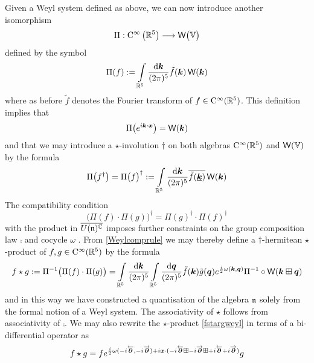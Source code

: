Given a Weyl system defined as above, we can now introduce another isomorphism
\begin{equation}
  \label{Omegaquantmap}
  \Pi : {\rm C}^\infty\left({\mathbb R}^5\right) \longrightarrow 
  \operatorname{{\sf W}}\bigl(\mathbb{V}\bigr)
\end{equation}
defined by the symbol
\begin{equation}
  \label{Omegafdef}
  \Pi(f):=\int\limits_{{\mathbb R}^5}\frac{{\rm d}{{\boldsymbol {k} }}}{(2\pi)^5} 
  \tilde{f}({{\boldsymbol {k} }}) \operatorname{{\sf W}}({{\boldsymbol {k} }})
\end{equation}
where as before $\tilde f$ denotes the Fourier transform of
$f\in{\rm C}^\infty({\mathbb R}^5)$. This definition implies that
\begin{equation}
  \label{weylmkDelta}
  \Pi\bigl( e^{ i{{\boldsymbol {k} }}\cdot{{\boldsymbol {x} }}}\bigr)=\operatorname{{\sf W}}({{\boldsymbol {k} }})
\end{equation}
and that we may introduce a $\star$-involution $\dag$ on both algebras
${\rm C}^\infty({\mathbb R}^5)$ and $\operatorname{{\sf W}}({\mathbb V})$ by the formula
\begin{equation}
  \label{involdef}
  \Pi\bigl(f^\dag\bigr)=\Pi\bigl(f\bigr)^\dag:=
  \int\limits_{{\mathbb R}^5}\frac{{\rm d}{{\boldsymbol {k} }}}{(2\pi)^5} \overline{
    \tilde f( \underline{{{\boldsymbol {k} }}} )} \operatorname{{\sf W}}({{\boldsymbol {k} }})
\end{equation}
The compatibility condition
\begin{equation}
  \label{compconddag}
  \bigl(\Pi(f)\cdot\Pi(g)\bigr)^\dag=\Pi(g)^\dag\cdot
  \Pi(f)^\dag
\end{equation}
with the product in $\overline{U({\mathfrak n})^{\mathbb C}}$ imposes further constraints on the
group composition law $\comp$ and cocycle $\omega$ \cite{ALZ1}. From
\eqref{Weylcomprule} we may thereby define a $\dag$-hermitean $\star$-product of
$f,g\in{\rm C}^\infty({\mathbb R}^5)$ by the formula
\begin{equation}
  \label{fstargweyl}
  f\star g:=\Pi^{-1}\bigl(\Pi(f)\cdot\Pi(g)\bigr)
  =\int\limits_{{\mathbb R}^5}\frac{{\rm d}{{\boldsymbol {k} }}}{(2\pi)^5} 
  \int\limits_{{\mathbb R}^5}\frac{{\rm d}{{\boldsymbol {q} }}}{(2\pi)^5} \tilde f({{\boldsymbol {k} }}) 
  \tilde g({{\boldsymbol {q} }})  e^{\frac i2 \omega({{\boldsymbol {k} }},{{\boldsymbol {q} }})} 
  \Pi^{-1}\circ\operatorname{{\sf W}}({{\boldsymbol {k} }}\boxplus{{\boldsymbol {q} }})
\end{equation}
and in this way we have constructed a quantisation of the algebra ${\mathfrak n}$ solely
from the formal notion of a Weyl system. The associativity of $\star$ follows
from associativity of $\comp$. We may also rewrite the $\star$-product
\eqref{fstargweyl} in terms of a bi-differential operator as
\begin{equation}
  \label{bidiffweyl}
  f\star g=f  e^{\frac i2 \omega( - i\overleftarrow{{\boldsymbol {\partial} }} , 
    - i\overrightarrow{{\boldsymbol {\partial} }} )+ i{{\boldsymbol {x} }}\cdot(- i\overleftarrow{{\boldsymbol {\partial} }} \boxplus
    - i\overrightarrow{{\boldsymbol {\partial} }}\boxplus + i\overleftarrow{{\boldsymbol {\partial} }}+ i
    \overrightarrow{{\boldsymbol {\partial} }} )} g
\end{equation}

